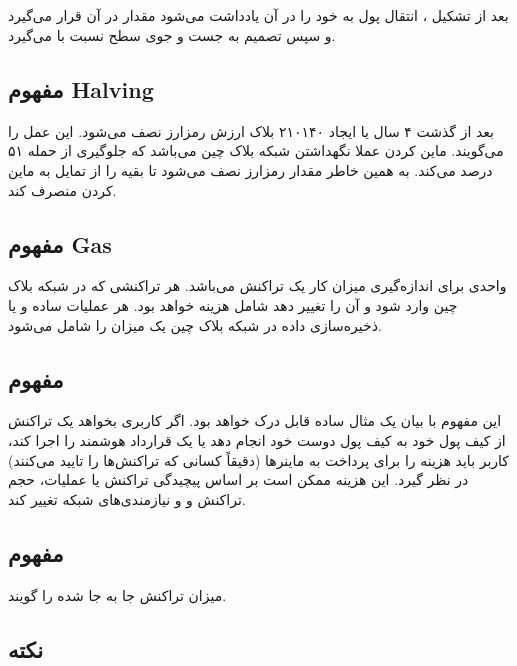 \documentclass[10pt, a4paper]{article}
\begin{document}
\subsection{}

بعد از تشکیل ، انتقال پول به خود را در آن یادداشت می‌شود مقدار
 در آن قرار می‌گیرد و سپس تصمیم به جست و جوی سطح 
نسبت با  می‌گیرد.

\subsection{مفهوم Halving}

بعد از گذشت ۴ سال یا ایجاد ۲۱۰۱۴۰ بلاک ارزش رمزارز نصف می‌شود. این عمل را
 می‌گویند. ماین کردن عملا نگهداشتن شبکه بلاک چین می‌باشد که جلوگیری
از حمله ۵۱ درصد می‌کند. به همین خاطر مقدار رمزارز نصف می‌شود تا بقیه را از تمایل
به ماین کردن منصرف کند.

\subsection{مفهوم Gas}

واحدی برای اندازه‌گیری میزان کار یک تراکنش می‌باشد. هر تراکنشی که در شبکه بلاک
چین وارد شود و آن را تغییر دهد شامل هزینه  خواهد بود. هر عملیات ساده و
یا ذخیره‌سازی داده در شبکه بلاک چین یک میزان  را شامل می‌شود.

\subsection{مفهوم }

این مفهوم با بیان یک مثال ساده قابل درک خواهد بود. اگر کاربری بخواهد یک تراکنش
از کیف پول خود به کیف پول دوست خود انجام دهد یا یک قرارداد هوشمند را اجرا کند،
کاربر باید هزینه  را برای پرداخت به ماینر‌ها (دقیقاً کسانی که
تراکنش‌ها را تایید می‌کنند) در نظر گیرد. این هزینه ممکن است بر اساس پیچیدگی
تراکنش یا عملیات، حجم تراکنش و و نیازمندی‌های شبکه تغییر کند.

\subsection{مفهوم }

میزان  تراکنش جا به جا شده را گویند.

\subsection*{نکته}
\end{document}
